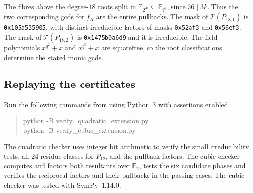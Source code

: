 \documentclass[11pt]{article}
\theoremstyle{definition}
\theoremstyle{remark}
\begin{document}
The fibres above the degree-$18$ roots split in
$\mathbb F_{2^{36}}\subseteq\mathbb F_{q^3}$, since $36\mid3k$.
Thus the two corresponding gcds for $f_R$ are the entire pullbacks.
The mask of $\mathcal T(P_{18,1})$ is \texttt{0x105a535905},
with distinct irreducible factors of masks \texttt{0x52af3}
and \texttt{0x56ef3}. The mask of $\mathcal T(P_{18,2})$
is \texttt{0x1475b0a6d9} and it is irreducible.
The field polynomials $x^{q^2}+x$ and $x^{q^3}+x$ are squarefree,
so the root classifications determine the stated monic gcds.

\subsection{Replaying the certificates}
Run the following commands from 
using Python~3 with assertions enabled.
\begin{quote}\small\ttfamily
python -B verify\_quadratic\_extension.py\\
python -B verify\_cubic\_extension.py
\end{quote}
The quadratic checker uses integer bit arithmetic to verify the
small irreducibility tests, all $24$ residue classes for $P_{12}$,
and the pullback factors. The cubic checker computes and factors
both resultants over $\mathbb F_2$, tests the six candidate phases
and verifies the reciprocal factors and their pullbacks in the
passing cases. The cubic checker was tested with SymPy~1.14.0.

\clearpage
\end{document}
